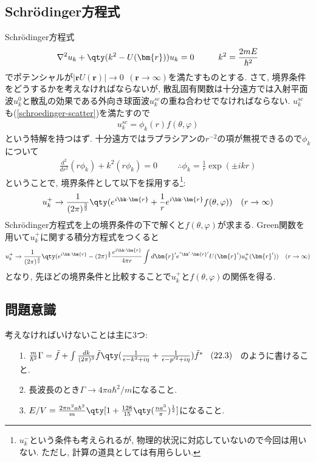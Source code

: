 \documentclass[10.5pt,a4paper]{jreport}
\begin{document}
\subsection{Schr\"odinger方程式}
Schr\"odinger方程式
\begin{eqnarray}
  \nabla^2u_k + \qty(k^2 - U(\bm{r}))u_k = 0\hspace{1cm} k^2 = \frac{2mE}{\hbar^2}\label{schroedinger-scatter}
\end{eqnarray}
でポテンシャルが$|\bm{r}U(\bm{r})|\rightarrow 0\ \ (\bm{r}\rightarrow\infty)$を満たすものとする. さて, 境界条件をどうするかを考えなければならないが, 散乱固有関数は十分遠方では入射平面波$u_k^0$と散乱の効果である外向き球面波$u_k^{sc}$の重ね合わせでなければならない. $u_k^{sc}$も(\ref{schroedinger-scatter})を満たすので
\begin{eqnarray}
  u_k^{sc} = \phi_k(r)f(\theta, \varphi)
\end{eqnarray}
という特解を持つはず. 十分遠方ではラプラシアンの$r^{-2}$の項が無視できるので$\phi_k$について
\begin{eqnarray}
  \frac{d^2}{dr^2}(r\phi_k) + k^2(r\phi_k) = 0\hspace{1cm}\therefore\phi_k = \frac{1}{r}\exp(\pm ikr)
\end{eqnarray}
ということで, 境界条件として以下を採用する\footnote{$u_k^-$という条件も考えられるが, 物理的状況に対応していないので今回は用いない. ただし, 計算の道具としては有用らしい. }:
\begin{eqnarray}
  u_k^+\rightarrow \frac{1}{(2\pi)^{\frac32}}\qty(e^{i\bk\cdot\bm{r}} + \frac{1}{r}e^{i\bk\cdot\bm{r}}f(\theta, \varphi))\ \ \ (r\rightarrow \infty)
\end{eqnarray}
Schr\"odinger方程式を上の境界条件の下で解くと$f(\theta, \varphi)$が求まる. Green関数を用いて$u_k^+$に関する積分方程式をつくると
\begin{eqnarray}
  u_k^+\rightarrow \frac{1}{(2\pi)^{\frac32}}\qty(e^{i\bk\cdot\bm{r}} - (2\pi)^{\frac32}\frac{e^{i\bk\cdot\bm{r}}}{4\pi r}\int d\bm{r}'e^{^i\bk'\cdot\bm{r}'}U(\bm{r}')u_k^+(\bm{r}'))\ \ \ (r\rightarrow \infty)\label{scatter-psi}
\end{eqnarray}
となり, 先ほどの境界条件と比較することで$u_k^+$と$f(\theta, \varphi)$の関係を得る.
\subsection{問題意識}
考えなければいけないことは主に3つ:
\begin{itemize}
\item[1.] $\frac{m}{\hbar^2}\Gamma = \tilde{f} + \int\frac{dk}{(2\pi)^3}\tilde{f}\qty(\frac{1}{\epsilon - k^2 + i\eta} + \frac{1}{\epsilon - p'^2 + i\eta})\tilde{f}^*\hspace{0.3cm}(22.3)\hspace{0.3cm}$のように書けること.
\item[2.] 長波長のとき$\Gamma\rightarrow 4\pi a\hbar^2/m$になること. 
\item[3.] $E/V = \frac{2\pi n^2a\hbar^2}{m}\qty[1 + \frac{128}{15}\qty(\frac{na^3}{\pi})^{\frac12}]$になること. 
\end{itemize}
\end{document}
